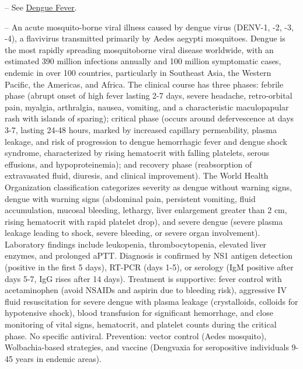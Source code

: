 -- See \hyperlink{Dengue Fever}{Dengue Fever}.

-- An acute mosquito-borne viral illness caused by dengue virus (DENV-1, -2, -3, -4), a flavivirus transmitted primarily by Aedes aegypti mosquitoes. Dengue is the most rapidly spreading mosquitoborne viral disease worldwide, with an estimated 390 million infections annually and 100 million symptomatic cases, endemic in over 100 countries, particularly in Southeast Asia, the Western Pacific, the Americas, and Africa. The clinical course has three phases: febrile phase (abrupt onset of high fever lasting 2-7 days, severe headache, retro-orbital pain, myalgia, arthralgia, nausea, vomiting, and a characteristic maculopapular rash with islands of sparing); critical phase (occurs around defervescence at days 3-7, lasting 24-48 hours, marked by increased capillary permeability, plasma leakage, and risk of progression to dengue hemorrhagic fever and dengue shock syndrome, characterized by rising hematocrit with falling platelets, serous effusions, and hypoproteinemia); and recovery phase (reabsorption of extravasated fluid, diuresis, and clinical improvement). The World Health Organization classification categorizes severity as dengue without warning signs, dengue with warning signs (abdominal pain, persistent vomiting, fluid accumulation, mucosal bleeding, lethargy, liver enlargement greater than 2 cm, rising hematocrit with rapid platelet drop), and severe dengue (severe plasma leakage leading to shock, severe bleeding, or severe organ involvement). Laboratory findings include leukopenia, thrombocytopenia, elevated liver enzymes, and prolonged aPTT. Diagnosis is confirmed by NS1 antigen detection (positive in the first 5 days), RT-PCR (days 1-5), or serology (IgM positive after days 5-7, IgG rises after 14 days). Treatment is supportive: fever control with acetaminophen (avoid NSAIDs and aspirin due to bleeding risk), aggressive IV fluid resuscitation for severe dengue with plasma leakage (crystalloids, colloids for hypotensive shock), blood transfusion for significant hemorrhage, and close monitoring of vital signs, hematocrit, and platelet counts during the critical phase. No specific antiviral. Prevention: vector control (Aedes mosquito), Wolbachia-based strategies, and vaccine (Dengvaxia for seropositive individuals 9-45 years in endemic areas).

